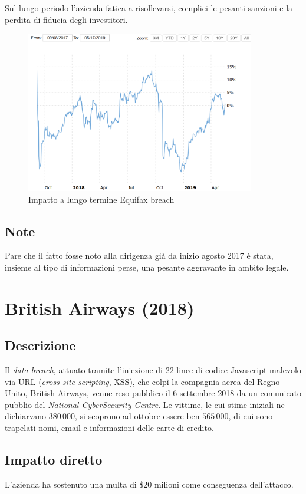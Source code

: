 \documentclass[12pt,a4paper,openright,twoside]{report}
\begin{document}
Sul lungo periodo l'azienda fatica a risollevarsi, complici le pesanti sanzioni e la perdita di fiducia degli investitori.\\

\begin{figure}[H] 
\begin{center} 
\includegraphics[width=10cm]{figures/equifax_long.png} 
\caption[Grafico Equifax long]{Impatto a lungo termine Equifax breach}\label{fig:eqx2}
\end{center}
\end{figure}

\subsection{Note}
Pare che il fatto fosse noto alla dirigenza gi\`a da inizio agosto 2017\cite{Uber_plusEquifaxAndYahoo} \`e stata, insieme al tipo di informazioni perse, una pesante aggravante in ambito legale.\\
\section{British Airways (2018)}
\subsection{Descrizione}
Il \textit{data breach}, attuato tramite l'iniezione di 22 linee di codice Javascript malevolo via URL (\textit{cross site scripting}, XSS), che colp\`i la compagnia aerea del Regno Unito, British Airways, venne reso pubblico il 6 settembre 2018 da un comunicato pubblio del \textit{National CyberSecurity Centre}. Le vittime, le cui stime iniziali ne dichiarvano $380\,000$, si scoprono ad ottobre essere ben $565\,000$, di cui sono trapelati nomi, email e informazioni delle carte di credito.\cite{BritAir} 
\subsection{Impatto diretto}
L'azienda ha sostenuto una multa di \$20 milioni come conseguenza dell'attacco.
\end{document}
